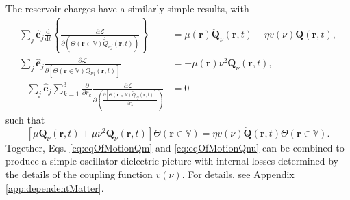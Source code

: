 \documentclass{article}
\begin{document}
The reservoir charges have a similarly simple results, with
\begin{equation}
\begin{split}
\sum_j\hat{\mathbf{e}}_j\frac{\mathrm{d}}{\mathrm{d}t}\left\{\frac{\partial \mathcal{L}}{\partial \left(\Theta(\mathbf{r}\in\mathbb{V})\dot{\tilde{Q}}_{\nu j}(\mathbf{r},t)\right)}\right\} &= \mu(\mathbf{r})\ddot{\mathbf{Q}}_\nu(\mathbf{r},t) -  \eta v(\nu)\dot{\mathbf{Q}}(\mathbf{r},t),\\
\sum_j\hat{\mathbf{e}}_j\frac{\partial \mathcal{L}}{\partial \left[\Theta(\mathbf{r}\in\mathbb{V})\tilde{Q}_{\nu j}(\mathbf{r},t)\right]} &= -\mu(\mathbf{r})\nu^2\mathbf{Q}_\nu(\mathbf{r},t),\\
-\sum_j\hat{\mathbf{e}}_j\sum_{k = 1}^3\frac{\partial}{\partial r_k}\frac{\partial \mathcal{L}}{\partial\!\left(\frac{\partial \left[\Theta(\mathbf{r}\in\mathbb{V})\tilde{Q}_{\nu j}(\mathbf{r},t)\right]}{\partial r_k}\right)} &= 0
\end{split}
\end{equation}
such that
\begin{equation}\label{eq:eqOfMotionQnu}
\left[\mu\ddot{\mathbf{Q}}_\nu(\mathbf{r},t) + \mu\nu^2\mathbf{Q}_\nu(\mathbf{r},t)\right]\Theta(\mathbf{r}\in\mathbb{V}) =  \eta v(\nu)\dot{\mathbf{Q}}(\mathbf{r},t)\Theta(\mathbf{r}\in\mathbb{V}).
\end{equation}
Together, Eqs. \eqref{eq:eqOfMotionQm} and \eqref{eq:eqOfMotionQnu} can be combined to produce a simple oscillator dielectric picture with internal losses determined by the details of the coupling function $ v(\nu)$. For details, see Appendix \ref{app:dependentMatter}.
\end{document}
